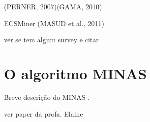 (PERNER, 2007)(GAMA, 2010)

ECSMiner (MASUD et al., 2011)

ver se tem algum survey e citar

\section{O algoritmo MINAS}

Breve descrição do MINAS \cite{Faria2016minas}.



ver paper da profa. Elaine

